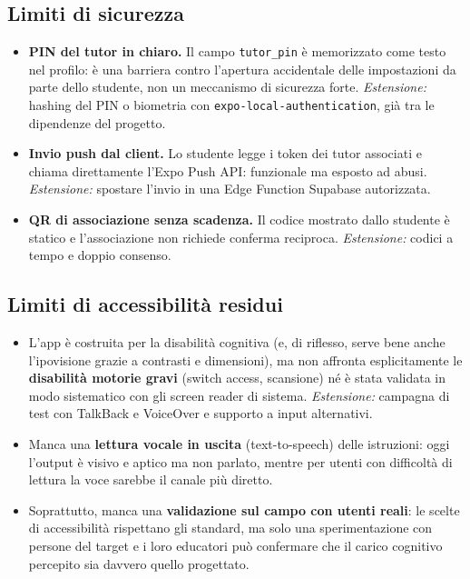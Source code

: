 \documentclass[11pt,a4paper]{article}
\begin{document}
\subsection{Limiti di sicurezza}
\begin{itemize}[leftmargin=1.4cm]
  \item \textbf{PIN del tutor in chiaro.} Il campo \texttt{tutor\_pin} \`e memorizzato come testo
  nel profilo: \`e una barriera contro l'apertura accidentale delle impostazioni da parte dello
  studente, non un meccanismo di sicurezza forte. \emph{Estensione:} hashing del PIN o biometria
  con \texttt{expo-local-authentication}, gi\`a tra le dipendenze del progetto.
  \item \textbf{Invio push dal client.} Lo studente legge i token dei tutor associati e chiama
  direttamente l'Expo Push API: funzionale ma esposto ad abusi. \emph{Estensione:} spostare
  l'invio in una Edge Function Supabase autorizzata.
  \item \textbf{QR di associazione senza scadenza.} Il codice mostrato dallo studente \`e statico
  e l'associazione non richiede conferma reciproca. \emph{Estensione:} codici a tempo e doppio
  consenso.
\end{itemize}

\subsection{Limiti di accessibilit\`a residui}
\begin{itemize}[leftmargin=1.4cm]
  \item L'app \`e costruita per la disabilit\`a cognitiva (e, di riflesso, serve bene anche
  l'ipovisione grazie a contrasti e dimensioni), ma non affronta esplicitamente le
  \textbf{disabilit\`a motorie gravi} (switch access, scansione) n\'e \`e stata validata in modo
  sistematico con gli screen reader di sistema. \emph{Estensione:} campagna di test con
  TalkBack e VoiceOver e supporto a input alternativi.
  \item Manca una \textbf{lettura vocale in uscita} (text-to-speech) delle istruzioni: oggi
  l'output \`e visivo e aptico ma non parlato, mentre per utenti con difficolt\`a di lettura la
  voce sarebbe il canale pi\`u diretto.
  \item Soprattutto, manca una \textbf{validazione sul campo con utenti reali}: le scelte di
  accessibilit\`a rispettano gli standard, ma solo una sperimentazione con persone del target e i
  loro educatori pu\`o confermare che il carico cognitivo percepito sia davvero quello progettato.
\end{itemize}
\end{document}
